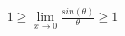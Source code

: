 \documentclass[preview]{standalone}
\begin{document}
\begin{align*}
1 \geq \lim_{x\to0}\frac{sin(\theta)}{\theta} \geq 1
\end{align*}
\end{document}
